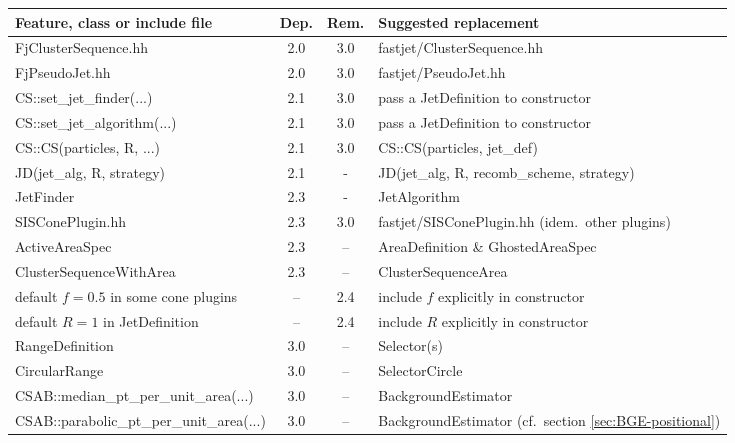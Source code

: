 \documentclass[12pt,a4]{article}
\begin{document}
\begin{table}
  \centering
  \begin{tabular}{lccl}\toprule
    Feature, class or include file
                    & Dep. & Rem.  & Suggested replacement\\\midrule
    FjClusterSequence.hh 
                    & 2.0   & 3.0  & fastjet/ClusterSequence.hh\\
    FjPseudoJet.hh  & 2.0   & 3.0  & fastjet/PseudoJet.hh\\\midrule
    CS::set\_jet\_finder(...)    & 2.1 & 3.0 & pass a JetDefinition to constructor\\
    CS::set\_jet\_algorithm(...) & 2.1 & 3.0 & pass a JetDefinition to constructor\\
    CS::CS(particles, R, ...)    & 2.1 & 3.0 & CS::CS(particles, jet\_def)\\
    JD(jet\_alg, R, strategy)    & 2.1 & -   & JD(jet\_alg, R, recomb\_scheme, strategy)\\
    \midrule
    JetFinder       & 2.3    & -   & JetAlgorithm \\
    SISConePlugin.hh  
                    & 2.3    & 3.0  & fastjet/SISConePlugin.hh (idem.\ other plugins)\\
    ActiveAreaSpec  & 2.3   &  --  & AreaDefinition \& GhostedAreaSpec\\
    ClusterSequenceWithArea 
                    & 2.3   &  --  & ClusterSequenceArea\\\midrule
    default $f=0.5$ in some cone plugins
                    & --    &  2.4 & include $f$ explicitly in constructor\\
    default $R=1$ in JetDefinition
                    & --    &  2.4 & include $R$ explicitly in constructor\\
    \midrule %
    RangeDefinition & 3.0   &  --  & Selector(s)        \\
    CircularRange   & 3.0   &  --  & SelectorCircle     \\
    CSAB::median\_pt\_per\_unit\_area(...)
                   & 3.0    & --   & BackgroundEstimator\\
    CSAB::parabolic\_pt\_per\_unit\_area(...)
                   & 3.0    & --   & BackgroundEstimator (cf.\ section \ref{sec:BGE-positional})\\

\end{tabular}
\end{table}
\end{document}
